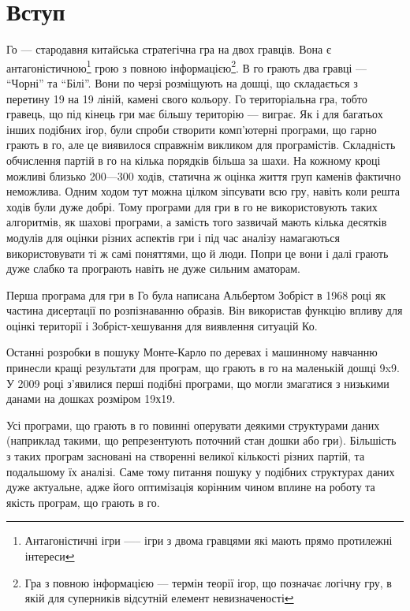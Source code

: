 \newpage
\section{Вступ}
Го --- стародавня китайська стратегічна гра на двох гравців.
Вона є антагоністичною\footnote{Антагоністичні ігри —-- ігри з двома гравцями які мають прямо протилежні інтереси} грою з повною інформацією\footnote{Гра з повною інформацією --- термін теорії ігор, що позначає логічну гру, в якій для суперників відсутній елемент невизначеності}.
В го грають два гравці --- ``Чорні'' та ``Білі''. Вони по черзі розміщують на дошці, що складається з перетину 19 на 19 ліній, камені свого кольору.
Го територіальна гра, тобто гравець, що під кінець гри має більшу територію --- виграє.
Як і для багатьох інших подібних ігор, були спроби створити комп'ютерні програми, що гарно грають в го, але це виявилося справжнім викликом для програмістів.
Складність обчислення партій в го на кілька порядків більша за шахи.
На кожному кроці можливі близько 200—300 ходів, статична ж оцінка життя груп каменів фактично неможлива.
Одним ходом тут можна цілком зіпсувати всю гру, навіть коли решта ходів були дуже добрі.
Тому програми для гри в го не використовують таких алгоритмів, як шахові програми, а замість того зазвичай мають кілька десятків модулів для оцінки різних аспектів гри і під час аналізу намагаються використовувати ті ж самі поняттями, що й люди.
Попри це вони і далі грають дуже слабко та програють навіть не дуже сильним аматорам.

Перша програма для гри в Го була написана Альбертом Зобріст в 1968 році як частина дисертації по розпізнаванню образів. Він використав функцію впливу для оцінкі території і Зобріст-хешування для виявлення ситуацій Ко.

Останні розробки в пошуку Монте-Карло по деревах і машинному навчанню принесли кращі результати для програм, що грають в го на маленькій дошці 9x9. У 2009 році з'явилися перші подібні програми, що могли змагатися з низькими данами на дошках розміром 19х19.

Усі програми, що грають в го повинні оперувати деякими структурами даних (наприклад такими, що репрезентують поточний стан дошки або гри).
Більшість з таких програм засновані на створенні великої кількості різних партій, та подальшому їх аналізі.
Саме тому питання пошуку у подібних структурах даних дуже актуальне, адже його оптимізація корінним чином вплине на роботу та якість програм, що грають в го.